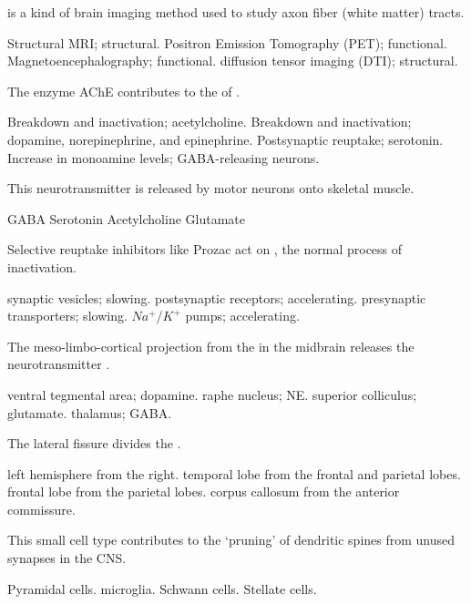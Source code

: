 \documentclass[answers]{exam}
\begin{document}
\begin{questions}
\question \fillin is a kind of \fillin brain imaging method used to study axon fiber (white matter) tracts.
\begin{choices}
\choice Structural MRI; structural.
\choice Positron Emission Tomography (PET); functional.
\choice Magnetoencephalography; functional.
\correctchoice diffusion tensor imaging (DTI); structural.
\end{choices}

\question The enzyme AChE contributes to the \fillin of \fillin.
\begin{choices}
\correctchoice  Breakdown and inactivation; acetylcholine.
\choice  Breakdown and inactivation; dopamine, norepinephrine, and epinephrine.
\choice  Postsynaptic reuptake; serotonin.
\choice  Increase in monoamine levels; GABA-releasing neurons.
\end{choices}

\question This neurotransmitter is released by motor neurons onto skeletal muscle.
\begin{choices}
\choice GABA
\choice Serotonin
\correctchoice Acetylcholine
\choice Glutamate
\end{choices}

\question Selective reuptake inhibitors like Prozac act on \fillin, \fillin the normal process of inactivation.
\begin{choices}
\choice  synaptic vesicles; slowing.
\choice  postsynaptic receptors; accelerating.
\correctchoice  presynaptic transporters; slowing.
\choice  $Na^+$/$K^+$ pumps; accelerating.
\end{choices}

\question The meso-limbo-cortical projection from the \fillin in the midbrain releases the neurotransmitter \fillin.
\begin{choices}
\correctchoice ventral tegmental area; dopamine.
\choice raphe nucleus; NE.
\choice superior colliculus; glutamate.
\choice thalamus; GABA.
\end{choices}

\newpage

\question The lateral fissure divides the \fillin.
\begin{choices}
\choice left hemisphere from the right.
\correctchoice temporal lobe from the frontal and parietal lobes.
\choice frontal lobe from the parietal lobes.
\choice corpus callosum from the anterior commissure.
\end{choices}

\question This small cell type contributes to the `pruning' of dendritic spines from unused synapses in the CNS.
\begin{choices}
\choice Pyramidal cells.
\correctchoice microglia.
\choice Schwann cells.
\choice Stellate cells.
\end{choices}


\end{questions}
\end{document}
